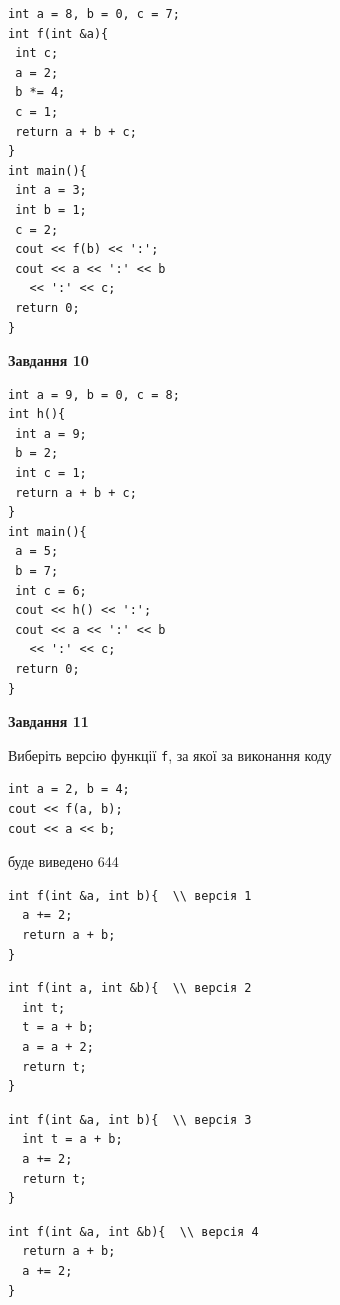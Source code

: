 \documentclass[12pt, ukrainian]{article}
\def\code#1{\Verb!#1!}
\begin{document}
{\begin {large}
\begin{minipage}[t]{7.0cm}
\begin{verbatim}
int a = 8, b = 0, c = 7;
int f(int &a){
 int c;
 a = 2;
 b *= 4;
 c = 1;
 return a + b + c;
}
int main(){
 int a = 3;
 int b = 1;
 c = 2;
 cout << f(b) << ':';
 cout << a << ':' << b 
   << ':' << c;
 return 0;
}
\end{verbatim}



\begin{center}
\textbf{Завдання 10}
\end{center}
\vspace{-8mm}

\begin{verbatim}
int a = 9, b = 0, c = 8;
int h(){
 int a = 9;
 b = 2;
 int c = 1;
 return a + b + c;
}
int main(){
 a = 5;
 b = 7;
 int c = 6;
 cout << h() << ':';
 cout << a << ':' << b 
   << ':' << c;
 return 0;
}
\end{verbatim}

\end{minipage}
\vline \hspace{1mm}
\begin{minipage}[t]{11.0cm}

\begin{center}
\textbf{Завдання 11}
\end{center}
Виберіть версію функції \code{f}, за якої за виконання коду
\begin{verbatim}
int a = 2, b = 4;
cout << f(a, b);
cout << a << b;
\end{verbatim}

буде виведено 644

\begin{verbatim}
int f(int &a, int b){  \\ версія 1
  a += 2;
  return a + b;
}
\end{verbatim}

\vspace{-8mm}\begin{verbatim}
int f(int a, int &b){  \\ версія 2
  int t;
  t = a + b;
  a = a + 2;
  return t;
}
\end{verbatim}

\vspace{-8mm}\begin{verbatim}
int f(int &a, int b){  \\ версія 3
  int t = a + b;
  a += 2;
  return t;
}
\end{verbatim}

\vspace{-8mm}\begin{verbatim}
int f(int &a, int &b){  \\ версія 4
  return a + b;
  a += 2;
}
\end{verbatim}




\end{minipage}
\end{large}}
\end{document}
